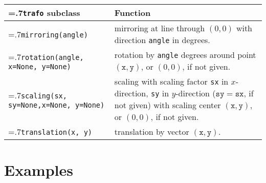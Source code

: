 \medskip
\begin{tabularx}{\linewidth}{>{\hsize=.7\hsize}X>{\raggedright\arraybackslash\hsize=1.3\hsize}X}
  \texttt{trafo} subclass & Function \\
  \hline 
  \texttt{mirroring(angle)} & mirroring at line through $(0,0)$
  with direction  \texttt{angle} in degrees.\\
  \texttt{rotation(angle, \newline\phantom{rotation(}x=None, y=None)} &
  rotation by \texttt{angle} degrees around point $(\mathtt{x},
  \mathtt{y})$, or $(0,0)$, if not given.\\
  \texttt{scaling(sx, sy=None,\newline\phantom{scaling(}x=None, y=None)} &
  scaling with scaling factor \texttt{sx} in $x$-direction,
  \texttt{sy} in $y$-direction ($\mathtt{sy}=\mathtt{sx}$, if not
  given) with scaling
  center $(\mathtt{x}, \mathtt{y})$, or $(0,0)$, if not given.\\
  \texttt{translation(x, y)} &
  translation by vector $(\mathtt{x}, \mathtt{y})$.\\
\end{tabularx}
\medskip


\section{Examples}



